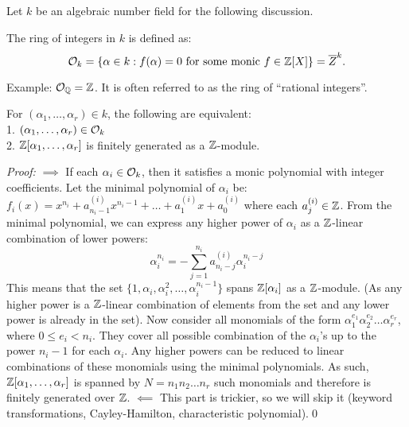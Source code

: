 \begin{outline}
    \0 Let $k$ be an algebraic number field for the following discussion.
    \begin{definition}
        The ring of integers in $k$ is defined as:
        $$\mathcal{O}_k=\{\alpha \in k : f(\alpha)=0 \text{ for some monic }f\in \mathbb{Z}[X]\}=\overline{Z}^k.$$
    \end{definition}
        \1 Example: $\mathcal{O}_{\mathbb{Q}} = \mathbb{Z}$. It is often referred to as the ring of \enquote{rational integers}.
    \0 \begin{proposition}
        For $(\alpha_1,\ldots,\alpha_r)\in k$, the following are equivalent:\\
        1. $(\alpha_1,\ldots,\alpha_r)\in\mathcal{O}_k$\\
        2. $\mathbb{Z}[\alpha_1,\ldots,\alpha_r]$ is finitely generated as a $\mathbb{Z}$-module.
    \end{proposition}
    \textit{Proof:} $\implies$ If each $\alpha_i \in \mathcal{O}_k$, then it satisfies a monic polynomial with integer coefficients. Let the minimal polynomial of $\alpha_i$ be: $f_i(x)=x^{n_i}+a^{(i)}_{n_i-1}x^{n_i-1}+\ldots + a^{(i)}_{1}x + a^{(i)}_0$ where each $a^{(i)}_j\in \mathbb{Z}$. From the minimal polynomial, we can express any higher power of $\alpha_i$ as a $\mathbb{Z}$-linear combination of lower powers:
    $$\alpha_i^{n_i} = -\sum_{j=1}^{n_i} a^{(i)}_{n_i-j}\alpha_i^{n_i-j}$$
    This means that the set $\{1,\alpha_i,\alpha_i^2,\ldots,\alpha_i^{n_i-1}\}$ spans $\mathbb{Z}[\alpha_i]$ as a $\mathbb{Z}$-module. (As any higher power is a $\mathbb{Z}$-linear combination of elements from the set and any lower power is already in the set). Now consider all monomials of the form $\alpha_1^{e_1} \alpha_2^{e_2} \ldots \alpha_r^{e_r}$, where $0\leq e_i< n_i$. They cover all possible combination of the $\alpha_i$'s up to the power $n_i-1$ for each $\alpha_i$. Any higher powers can be reduced to linear combinations of these monomials using the minimal polynomials. As such, $\mathbb{Z}[\alpha_1, \ldots, \alpha_r]$ is spanned by $N=n_1 n_2 \ldots n_r$ such monomials and therefore is finitely generated over $\mathbb{Z}$. $\impliedby$ This part is trickier, so we will skip it (keyword transformations, Cayley-Hamilton, characteristic polynomial).\qed

\end{outline}
